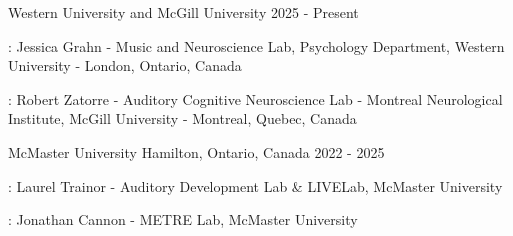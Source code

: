 

\begin{cventries}

  \cventry
    {} %
    {Western University and McGill University} %
    {} %
    { 2025 - Present}%
    {%
      \begin{cvitems} %
        \item {}: Jessica Grahn  - 
           Music and Neuroscience Lab, Psychology Department, Western
           University - London, Ontario, Canada
      \item {}: Robert Zatorre - 
        Auditory Cognitive Neuroscience Lab - Montreal Neurological Institute,
        McGill University - Montreal, Quebec, Canada
      \end{cvitems}
    }

  \cventry
    {} %
    {McMaster University} %
    {Hamilton, Ontario, Canada} %
    { 2022 -  2025}%
    {%
      \begin{cvitems} %
        \item {}: Laurel Trainor - 
          Auditory Development Lab \& LIVELab, McMaster University
      \item {}: Jonathan Cannon - 
          METRE Lab, McMaster University
      \end{cvitems}
    }


\end{cventries}
